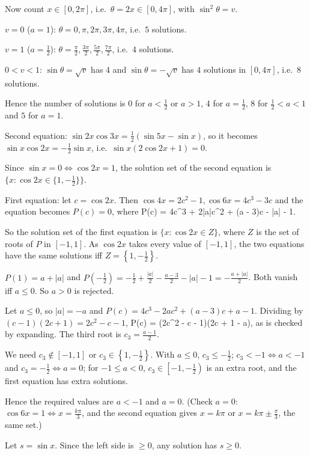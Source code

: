   Now count $x\in[0, 2\pi]$, i.e.\ $\theta = 2x\in[0, 4\pi]$, with $\sin^2\theta = v$.

  $v = 0$ ($a = 1$): $\theta = 0, \pi, 2\pi, 3\pi, 4\pi$, i.e.\ $5$ solutions.

  $v = 1$ ($a = \frac{1}{2}$): $\theta = \frac{\pi}{2}, \frac{3\pi}{2}, \frac{5\pi}{2}, \frac{7\pi}{2}$, i.e.\ $4$
  solutions.

  $0 < v < 1$: $\sin\theta = \sqrt{v}$ has $4$ and $\sin\theta = -\sqrt{v}$ has $4$ solutions in $[0, 4\pi]$, i.e.\
  $8$ solutions.

  Hence the number of solutions is $0$ for $a < \frac{1}{2}$ or $a > 1$, $4$ for $a = \frac{1}{2}$, $8$ for
  $\frac{1}{2} < a < 1$ and $5$ for $a = 1$.
\item Second equation: $\sin2x\cos3x = \frac{1}{2}(\sin5x - \sin x)$, so it becomes $\sin x\cos2x = -\frac{1}{2}\sin
  x$, i.e.\ $\sin x(2\cos2x + 1) = 0$.

  Since $\sin x = 0\Leftrightarrow\cos2x = 1$, the solution set of the second equation is $\{x: \cos2x\in\{1,
  -\frac{1}{2}\}\}$.

  First equation: let $c = \cos2x$. Then $\cos4x = 2c^2 - 1, \cos6x = 4c^3 - 3c$ and the equation becomes $P(c) =
  0$, where
  \startformula
    P(c) = 4c^3 + 2|a|c^2 + (a - 3)c - |a| - 1.
  \stopformula

  So the solution set of the first equation is $\{x: \cos2x\in Z\}$, where $Z$ is the set of roots of $P$ in $[-1,
  1]$. As $\cos2x$ takes every value of $[-1, 1]$, the two equations have the same solutions iff $Z = \left\{1,
  -\frac{1}{2}\right\}$.

  $P(1) = a + |a|$ and $P\left(-\frac{1}{2}\right) = -\frac{1}{2} + \frac{|a|}{2} - \frac{a - 3}{2} - |a| - 1 =
  -\frac{a + |a|}{2}$. Both vanish iff $a\le 0$. So $a > 0$ is rejected.

  Let $a\le 0$, so $|a| = -a$ and $P(c) = 4c^3 - 2ac^2 + (a - 3)c + a - 1$. Dividing by $(c - 1)(2c + 1) = 2c^2 - c -
  1$,
  \startformula
    P(c) = (2c^2 - c - 1)(2c + 1 - a),
  \stopformula
  as is checked by expanding. The third root is $c_3 = \frac{a - 1}{2}$.

  We need $c_3\notin[-1, 1]$ or $c_3\in\left\{1, -\frac{1}{2}\right\}$. With $a\le 0$, $c_3\le -\frac{1}{2}$;
  $c_3 < -1\Leftrightarrow a < -1$ and $c_3 = -\frac{1}{2}\Leftrightarrow a = 0$; for $-1\le a < 0$, $c_3\in\left[-1,
  -\frac{1}{2}\right)$ is an extra root, and the first equation has extra solutions.

  Hence the required values are $a < -1$ and $a = 0$. (Check $a = 0$: $\cos6x = 1\Leftrightarrow x = \frac{k\pi}{3}$,
  and the second equation gives $x = k\pi$ or $x = k\pi\pm\frac{\pi}{3}$, the same set.)
\item Let $s = \sin x$. Since the left side is $\ge 0$, any solution has $s\ge 0$.

